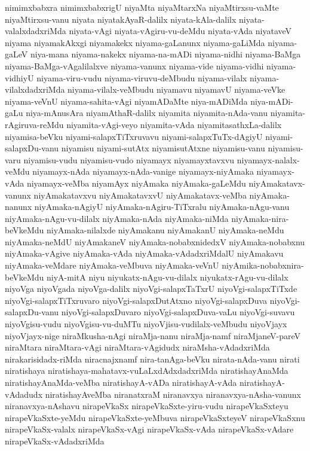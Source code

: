 {nimimxbabxra
nimimxbabxrigU
niyaMta
niyaMtarxNa
niyaMtirxsu-vaMte
niyaMtirxsu-vanu
niyata
niyatakAyaR-dalilx
niyata-kAla-dalilx
niyata-valalxdadxriMda
niyata-vAgi
niyata-vAgiru-vu-deMdu
niyata-vAda
niyataveV
niyama
niyamakAkxgi
niyamakekx
niyama-gaLanunx
niyama-gaLiMda
niyama-gaLeV
niya-mana
niyama-nakekx
niyama-na-mADi
niyama-nidhi
niyama-BaMga
niyama-BaMga-vAgalilalxve
niyama-vanunx
niyama-vide
niyama-vidhi
niyama-vidhiyU
niyama-viru-vudu
niyama-viruvu-deMbudu
niyama-vilalx
niyama-vilalxdadxriMda
niyama-vilalx-veMbudu
niyamavu
niyamavU
niyama-veVke
niyama-veVnU
niyama-sahita-vAgi
niyamADaMte
niya-mADiMda
niya-mADi-gaLu
niya-mAnusAra
niyamAthaR-dalilx
niyamita
niyamita-nAda-vanu
niyamita-rAgiruva-reMdu
niyamita-vAgi-veyo
niyamita-vAda
niyamitasathxLa-dalilx
niyamisa-beVku
niyami-salapxTiTxruvavu
niyami-salapxTuTx-dAgiyU
niyami-salapxDu-vanu
niyamisu
niyami-sutAtx
niyamisutAtxne
niyamisu-vanu
niyamisu-varu
niyamisu-vudu
niyamisu-vudo
niyamayx
niyamayxtavxvu
niyamayx-nalalx-veMdu
niyamayx-nAda
niyamayx-nAda-vanige
niyamayx-niyAmaka
niyamayx-vAda
niyamayx-veMba
niyamAyx
niyAmaka
niyAmaka-gaLeMdu
niyAmakatavx-vanunx
niyAmakatavxvu
niyAmakatavxvU
niyAmakatavx-veMba
niyAmaka-nanunx
niyAmaka-nAgiyU
niyAmaka-nAgiru-TiTxralu
niyAmaka-nAgu-vanu
niyAmaka-nAgu-vu-dilalx
niyAmaka-nAda
niyAmaka-niMda
niyAmaka-nira-beVkeMdu
niyAmaka-nilalxde
niyAmakanu
niyAmakanU
niyAmaka-neMdu
niyAmaka-neMdU
niyAmakaneV
niyAmaka-nobabxnidedxV
niyAmaka-nobabxnu
niyAmaka-vAgive
niyAmaka-vAda
niyAmaka-vAdadxriMdalU
niyAmakavu
niyAmaka-veMdare
niyAmaka-veMbuva
niyAmaka-veVnU
niyAmika-nobabxnira-beVkeMdu
niyA-mitA
niyu
niyukatx-nAgu-vu-dilalx
niyukatx-rAgu-vu-dilalx
niyoVga
niyoVgada
niyoVga-dalilx
niyoVgi-salapxTaTxrU
niyoVgi-salapxTiTxde
niyoVgi-salapxTiTxruvaro
niyoVgi-salapxDutAtxno
niyoVgi-salapxDuva
niyoVgi-salapxDu-vanu
niyoVgi-salapxDuvaro
niyoVgi-salapxDuva-vaLu
niyoVgi-suvavu
niyoVgisu-vudu
niyoVgisu-vu-duMTu
niyoVjisu-vudilalx-veMbudu
niyoVjayx
niyoVjayx-nige
niraMkusha-nAgi
niraMja-nanu
niraMja-namf
niraMjaneV-pareV
niraMtara
niraMtara-vAgi
niraMtara-vAgidudx
niraMsha-vAdadxriMda
nirakarisidadx-riMda
niracnajxnamf
nira-tanAga-beVku
nirata-nAda-vanu
nirati
niratishaya
niratishaya-mahatavx-vuLaLxdAdxdadxriMda
niratishayAnaMda
niratishayAnaMda-veMba
niratishayA-vADa
niratishayA-vAda
niratishayA-vAdadudx
niratishayAveMba
niranatxraM
niranavxya
niranavxya-nAsha-vanunx
niranavxya-nAshavu
nirapeVkaSx
nirapeVkaSxte-yiru-vudu
nirapeVkaSxteyu
nirapeVkaSxte-yeMdu
nirapeVkaSxte-yeMbuva
nirapeVkaSxteyeV
nirapeVkaSxnu
nirapeVkaSx-valalx
nirapeVkaSx-vAgi
nirapeVkaSx-vAda
nirapeVkaSx-vAdare
nirapeVkaSx-vAdadxriMda
}
